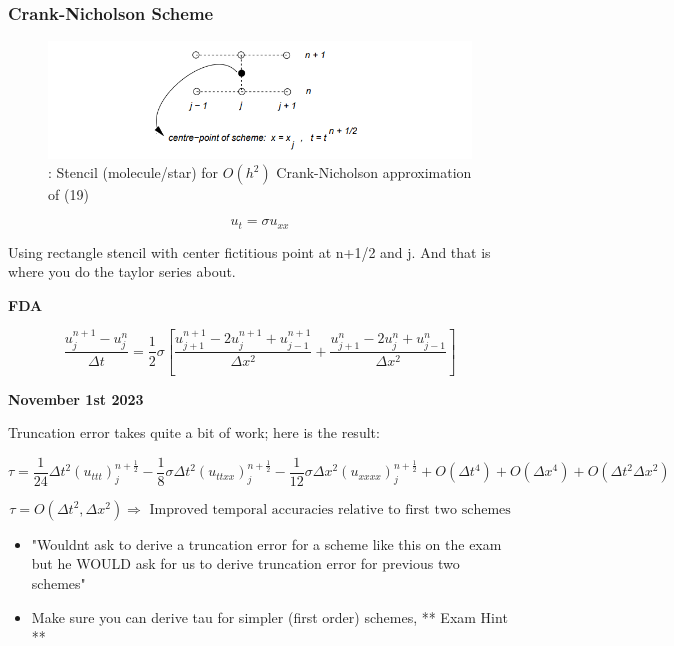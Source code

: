 \subsubsection{Crank-Nicholson Scheme}

\begin{figure}
    \centering
    \includegraphics[width = \linewidth]{Images/crank_nicholson_scheme.png}
    \caption{: Stencil (molecule/star) for $O(h^2)$ Crank-Nicholson approximation of (19)}
    \label{fig:crank-nicholson}
\end{figure}

\[ u_t = \sigma u_{xx}\]

Using rectangle stencil with center fictitious point at n+1/2 and j. And that is where you do the taylor series about.

\textbf{FDA}

\begin{equation}
    \frac{u_j^{n+1}-u_j^n}{\Delta t} = \frac{1}{2} \sigma \left[ \frac{u_{j+1}^{n+1} - 2u_j^{n+1} + u_{j-1}^{n+1}}{\Delta x^2} + \frac{u_{j+1}^n-2u_j^n+u_{j-1}^n}{\Delta x^2} \right]
\end{equation}

\textbf{November 1st 2023}

Truncation error takes quite a bit of work; here is the result:

\[ \tau = \frac{1}{24} \Delta t^2 (u_{ttt})_j^{n+\frac{1}{2}} - \frac{1}{8} \sigma \Delta t^2 (u_{ttxx})_j^{n+\frac{1}{2}} - \frac{1}{12} \sigma \Delta x^2 (u_{xxxx})_j^{n+\frac{1}{2}}+O(\Delta t^4) + O(\Delta x^4) + O(\Delta t^2 \Delta x^2)\]

\[ \tau = O(\Delta t^2, \Delta x^2) \Rightarrow \text{ Improved temporal accuracies relative to first two schemes}\]

\begin{itemize}
    \item "Wouldnt ask to derive a truncation error for a scheme like this on the exam but he WOULD ask for us to derive truncation error for previous two schemes"
    \item Make sure you can derive tau for simpler (first order) schemes, ** Exam Hint **
\end{itemize}


